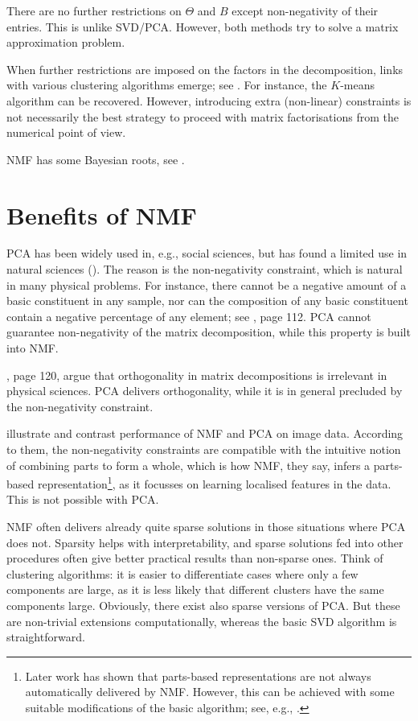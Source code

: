 \documentclass[]{article}
\begin{document}
There are no further restrictions on $\Theta$ and $B$ except non-negativity of their entries. This is unlike SVD/PCA. However, both methods try to solve a matrix approximation problem.

When further restrictions are imposed on the factors in the decomposition, links with various clustering algorithms emerge; see \citet{ding2005}. For instance, the $K$-means algorithm can be recovered. However, introducing extra (non-linear) constraints is not necessarily the best strategy to proceed with matrix factorisations from the numerical point of view.

NMF has some Bayesian roots, see \citet{richardson1972}.

\section{Benefits of NMF}

PCA has been widely used in, e.g., social sciences, but has found a limited use in natural sciences (\citet{paatero1994}). The reason is the non-negativity constraint, which is natural in many physical problems. For instance, there cannot be a negative amount of a basic constituent in any sample, nor can the composition of any basic constituent contain a negative percentage of any element; see \citet{paatero1994}, page 112. PCA cannot guarantee non-negativity of the matrix decomposition, while this property is built into NMF.

\citet{paatero1994}, page 120, argue that orthogonality in matrix decompositions is irrelevant in physical sciences. PCA delivers orthogonality, while it is in general precluded by the non-negativity constraint.

\citet{lee1999} illustrate and contrast performance of NMF and PCA on image data. According to them, the non-negativity constraints are compatible with the intuitive notion of combining parts to form a whole, which is how NMF, they say, infers a parts-based representation\footnote{Later work has shown that parts-based representations are not always automatically delivered by NMF. However, this can be achieved with some suitable modifications of the basic algorithm; see, e.g., \citet{hoyer2004}.}, as it focusses on learning localised features in the data. This is not possible with PCA.

NMF often delivers already quite sparse solutions in those situations where PCA does not. Sparsity helps with interpretability, and sparse solutions fed into other procedures often give better practical results than non-sparse ones. Think of clustering algorithms: it is easier to differentiate cases where only a few components are large, as it is less likely that different clusters have the same components large. Obviously, there exist also sparse versions of PCA. But these are non-trivial extensions computationally, whereas the basic SVD algorithm is straightforward.
\end{document}
